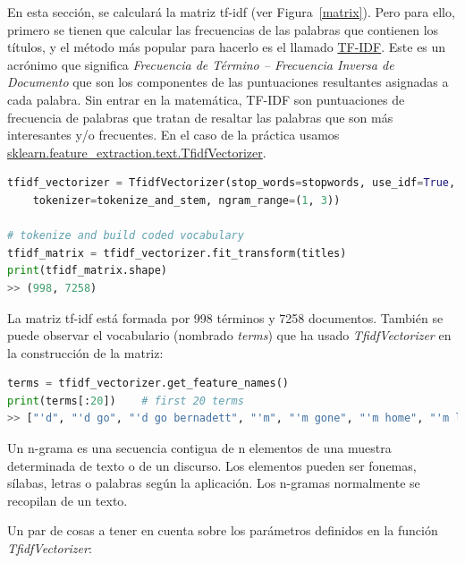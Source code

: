 \documentclass{uimppracticas}
\begin{document}
En esta sección, se calculará la matriz tf-idf (ver Figura~\ref{matrix}). Pero para ello, primero se tienen que calcular las frecuencias de las palabras que contienen los títulos, y el método más popular para hacerlo es el llamado \href{https://es.wikipedia.org/wiki/Tf-idf}{TF-IDF}. Este es un acrónimo que significa \textit{Frecuencia de Término – Frecuencia Inversa de Documento} que son los componentes de las puntuaciones resultantes asignadas a cada palabra. Sin entrar en la matemática, TF-IDF son puntuaciones de frecuencia de palabras que tratan de resaltar las palabras que son más interesantes y/o frecuentes. En el caso de la práctica usamos \href{https://scikit-learn.org/stable/modules/generated/sklearn.feature_extraction.text.TfidfVectorizer.html}{sklearn.feature\_extraction.text.TfidfVectorizer}.

\newpage 

\begin{lstlisting}[language=python]
tfidf_vectorizer = TfidfVectorizer(stop_words=stopwords, use_idf=True, 
	tokenizer=tokenize_and_stem, ngram_range=(1, 3))
									
# tokenize and build coded vocabulary
tfidf_matrix = tfidf_vectorizer.fit_transform(titles)
print(tfidf_matrix.shape)
>> (998, 7258)
\end{lstlisting}

La matriz tf-idf está formada por 998 términos y 7258 documentos. También se puede observar el vocabulario (nombrado \textit{terms}) que ha usado \textit{TfidfVectorizer} en la construcción de la matriz:

\begin{lstlisting}[language=python]
terms = tfidf_vectorizer.get_feature_names()
print(terms[:20])    # first 20 terms
>> ["'d", "'d go", "'d go bernadett", "'m", "'m gone", "'m home", "'m lie", "'m lie tell", "'s", "'s alic", "'s alic wonderland", "'s astound", "'s astound stori", "'s autobiographi", "'s babi", "'s babi ice", "'s berlin", "'s call", "'s call cormoran", "'s childhood"]
\end{lstlisting}

\begin{definition}\label{n_grama}
Un n-grama es una secuencia contigua de n elementos de una muestra determinada de texto o de un discurso. Los elementos pueden ser fonemas, sílabas, letras o palabras según la aplicación. Los n-gramas normalmente se recopilan de un texto.
\end{definition}

Un par de cosas a tener en cuenta sobre los parámetros definidos en la función \textit{TfidfVectorizer}:
\end{document}
